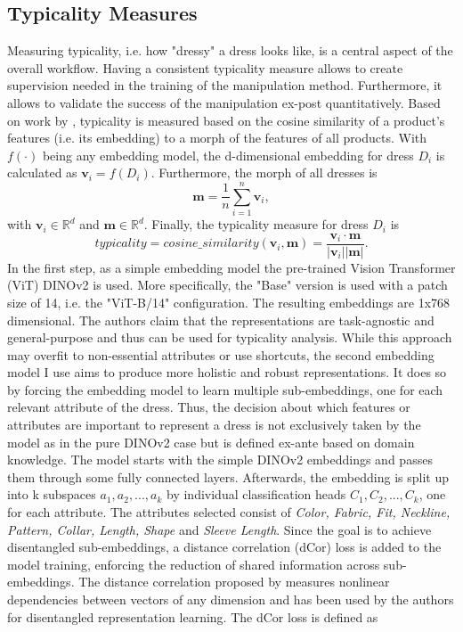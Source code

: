 \subsection{Typicality Measures}\label{sec:typicality_measures}
Measuring typicality, i.e. how "dressy" a dress looks like, is a central aspect of the overall workflow. Having a consistent typicality measure allows to create supervision needed in the training of the manipulation method. Furthermore, it allows to validate the success of the manipulation ex-post quantitatively. Based on work by \cite{landwehr2011gut}, typicality is measured based on the cosine similarity of a product's features (i.e. its embedding) to a morph of the features of all products. With $f(\cdot)$ being any embedding model, the d-dimensional embedding for dress $D_i$ is calculated as $\boldsymbol{v}_i = f(D_i)$. Furthermore, the morph of all dresses is 
$$\boldsymbol{m} = \frac{1}{n} \sum_{i=1}^{n}\boldsymbol{v}_i,$$
with $\boldsymbol{v}_i \in \mathbb{R}^d$ and $\boldsymbol{m} \in \mathbb{R}^d$. Finally, the typicality measure for dress $D_i$ is 
$$typicality = cosine\_similarity(\boldsymbol{v}_i, \boldsymbol{m}) = \frac{\boldsymbol{v}_i \cdot \boldsymbol{m}}{|\boldsymbol{v}_i||\boldsymbol{m}|}.$$
In the first step, as a simple embedding model the pre-trained Vision Transformer (ViT) DINOv2 \citep{oquab2023dinov2} is used. More specifically, the "Base" version is used with a patch size of 14, i.e. the "ViT-B/14" configuration. The resulting embeddings are 1x768 dimensional. The authors claim that the representations are task-agnostic and general-purpose \citep[p.1]{oquab2023dinov2} and thus can be used for typicality analysis. While this approach may overfit to non-essential attributes or use shortcuts, the second embedding model I use aims to produce more holistic and robust representations. It does so by forcing the embedding model to learn multiple sub-embeddings, one for each relevant attribute of the dress. Thus, the decision about which features or attributes are important to represent a dress is not exclusively taken by the model as in the pure DINOv2 case but is defined ex-ante based on domain knowledge. The model starts with the simple DINOv2 embeddings and passes them through some fully connected layers. Afterwards, the embedding is split up into k subspaces $a_1,a_2,...,a_k$ by individual classification heads $C_1,C_2,...,C_k$, one for each attribute. The attributes selected consist of \textit{Color, Fabric, Fit, Neckline, Pattern, Collar, Length, Shape} and \textit{Sleeve Length}. Since the goal is to achieve disentangled sub-embeddings, a distance correlation (dCor) loss is added to the model training, enforcing the reduction of shared information across sub-embeddings. The distance correlation proposed by \cite{muller2024disentangling} measures nonlinear dependencies between vectors of any dimension and has been used by the authors for disentangled representation learning. The dCor loss is defined as 

